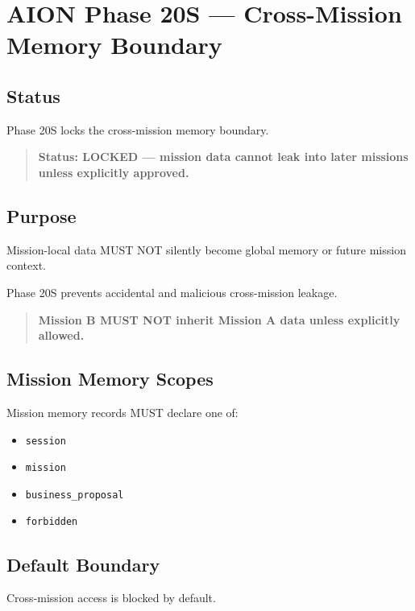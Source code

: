\section{AION Phase 20S --- Cross-Mission Memory Boundary}
\label{sec:aion-phase20s-cross-mission-memory-boundary}

\subsection{Status}

Phase 20S locks the cross-mission memory boundary.

\begin{quote}
\textbf{Status: LOCKED --- mission data cannot leak into later missions unless explicitly approved.}
\end{quote}

\subsection{Purpose}

Mission-local data MUST NOT silently become global memory or future mission context.

Phase 20S prevents accidental and malicious cross-mission leakage.

\begin{quote}
\textbf{Mission B MUST NOT inherit Mission A data unless explicitly allowed.}
\end{quote}

\subsection{Mission Memory Scopes}

Mission memory records MUST declare one of:

\begin{itemize}
  \item \texttt{session}
  \item \texttt{mission}
  \item \texttt{business\_proposal}
  \item \texttt{forbidden}
\end{itemize}

\subsection{Default Boundary}

Cross-mission access is blocked by default.

